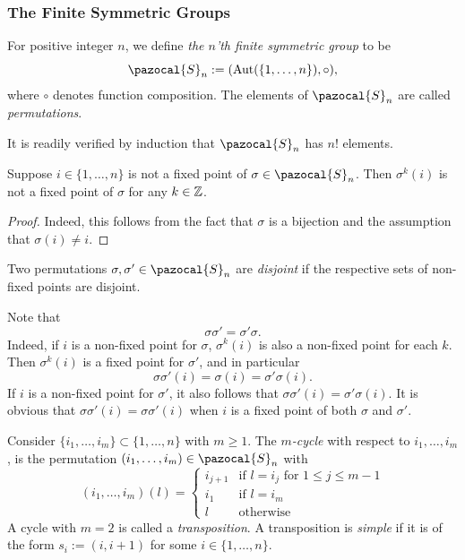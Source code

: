 \subsubsection{The Finite Symmetric Groups}
\begin{definition}
    For positive integer $n$, we define \emph{the $n$'th finite symmetric group} to be
    $$
        \pazocal{S}_n := (\Aut(\{1,\dots,n\}),\circ), 
    $$
    where $\circ$ denotes function composition. The elements of $\pazocal{S}_n$ are called \emph{permutations}.
\end{definition}
\begin{remark}
    It is readily verified by induction that $\pazocal{S}_n$ has $n!$ elements.
\end{remark}
\begin{lemma}
    Suppose $i\in \{1,\dots,n\}$ is not a fixed point of $\sigma\in \pazocal{S}_n$. Then $\sigma^{k}(i)$ is not a fixed point of $\sigma$ for any $k\in \mathbb{Z}$. 
\end{lemma}
\begin{proof}
    Indeed, this follows from the fact that $\sigma$ is a bijection and the assumption that $\sigma(i)\neq i$. 
\end{proof}
\begin{definition}
    Two permutations $\sigma,\sigma'\in \pazocal{S}_n$ are \emph{disjoint} if the respective sets of non-fixed points are disjoint.
\end{definition}
\begin{remark}
    Note that 
    $$
        \sigma\sigma' = \sigma'\sigma.
    $$
    Indeed, if $i$ is a non-fixed point for $\sigma$, $\sigma^k(i)$ is also a non-fixed point for each $k$. Then $\sigma^k(i)$ is a fixed point for $\sigma'$, and in particular 
    $$
        \sigma\sigma'(i)=\sigma(i) = \sigma'\sigma(i).
    $$
    If $i$ is a non-fixed point for $\sigma'$, it also follows that $\sigma\sigma'(i)=\sigma'\sigma(i)$. It is obvious that $\sigma\sigma'(i)=\sigma\sigma'(i)$ when $i$ is a fixed point of both $\sigma$ and $\sigma'$.
\end{remark}
\begin{definition}
    Consider $\{i_1,\dots,i_m\}\subset \{1,\dots,n\}$ with $m\geq 1$. The \emph{$m$-cycle} with respect to $i_1,\dots,i_m$, is the permutation $(i_1,\dots,i_m)\in \pazocal{S}_n$ with 
    $$
        (i_1,\dots,i_m)(l) = 
        \begin{cases}
            i_{j+1} & \text{if } l=i_j \text{ for } 1\leq j\leq m-1\\
            i_1 & \text{if } l=i_{m}\\
            l & \text{otherwise }    
        \end{cases}
    $$
    A cycle with $m=2$ is called a \emph{transposition}. A transposition is \emph{simple} if it is of the form $s_i:=(i,i+1)$ for some $i\in \{1,\dots,n\}$. 
\end{definition}
